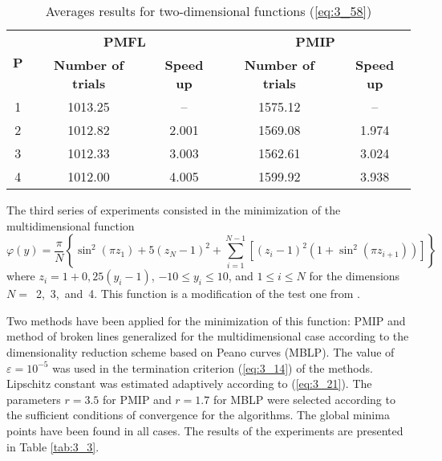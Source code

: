 	\begin{table}[ht]
		\centering
	\caption{Averages results for two-dimensional functions  (\ref{eq:3_58})}
	\label{tab:3_2}
	{\setlength{\extrarowheight}{1.5pt}
	\begin{tabular}
		{|c|c|c|c|c|}
		\hline
		\multirow{2}{*}{\textbf{P}} & \multicolumn{2}{|c|}{\textbf{PMFL}}  & \multicolumn{2}{|c|}{\textbf{PMIP}} \\ \cline{2-5}
		 & \textbf{Number of trials} & \textbf{Speed up} & \textbf{Number of trials} & \textbf{Speed up} \\ \hline
		1 & 1013.25 & --    & 1575.12 & --    \\ 		\hline
		2 & 1012.82 & 2.001 & 1569.08 & 1.974 \\ 		\hline
		3 & 1012.33 & 3.003 & 1562.61 & 3.024 \\ 		\hline
		4 & 1012.00 & 4.005 & 1599.92 & 3.938 \\ 		\hline
	\end{tabular}
}
	\end{table}
	
	The third series of experiments consisted in the minimization of the multidimensional function 
	\begin{equation}
	\label{eq:3_59}
	\varphi (y)=\frac{\pi }{N} \left\{\sin ^{2} (\pi z_{1} )+5(z_{N} -1)^2 +\sum _{i=1}^{N-1}\left[(z_{i} -1)^2 (1+\sin ^2 (\pi z_{i+1} ))\right] \right\}
	\end{equation}
	where $z_{i} =1+0,25(y_i -1)$, $-10\le y_{i} \le 10$, and $1\le i\le N$ for the dimensions $N=$~2,~3,~and~4. This function is a modification of the test one from \cite{3_LucidiPiccioni}. 
	
	Two methods have been applied for the minimization of this function: PMIP and method of broken lines generalized for the multidimensional case according to the dimensionality reduction scheme based on Peano curves (MBLP). The value of $\varepsilon =10^{-5} $ was used in the termination criterion  (\ref{eq:3_14}) of the methods. Lipschitz constant was estimated adaptively according to  (\ref{eq:3_21}). The parameters $r=3.5$ for PMIP and  $r=1.7$ for MBLP were selected according to the sufficient conditions of convergence for the algorithms. The global minima points have been found in all cases. The results of the experiments are presented in Table \ref{tab:3_3}.
	

